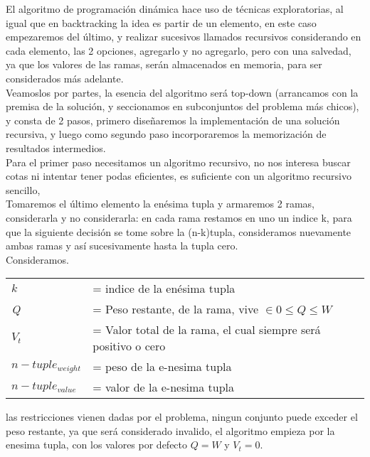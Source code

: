 \documentclass[fleqn, 11pt]{article}
\begin{document}
El algoritmo de programación dinámica hace uso de técnicas exploratorias, al igual que en backtracking la idea es
partir de un elemento, en este caso empezaremos del último, y realizar sucesivos llamados recursivos considerando
en cada elemento, las 2 opciones, agregarlo y no agregarlo, pero con una salvedad, ya que los valores de las ramas,
serán almacenados en memoria, para ser considerados más adelante. \\

Veamoslos por partes, la esencia del algoritmo será top-down (arrancamos con la premisa de la solución, y seccionamos
en subconjuntos del problema más chicos), y consta de 2 pasos, primero diseñaremos la implementación de una solución
recursiva, y luego como segundo paso incorporaremos la memorización de resultados intermedios.  \\

Para el primer paso necesitamos un algoritmo recursivo, no nos interesa buscar cotas ni intentar tener podas eficientes,
es suficiente con un algoritmo recursivo sencillo,  \\

Tomaremos el último elemento la enésima tupla y armaremos 2 ramas, considerarla y no considerarla: en cada rama restamos
en uno un indice k, para que la siguiente decisión se tome sobre la (n-k)tupla, consideramos nuevamente ambas ramas y
así sucesivamente hasta la tupla cero.\\

Consideramos.\\
\begin{tabular}{l l}
    \textit{$k$} & = indice de la enésima tupla  \\
    \textit{Q} & = Peso restante, de la rama, vive $ \in 0 \leq \textit{Q} \leq W $  \\
    \textit{$V_t$} & = Valor total de la rama, el cual siempre será positivo o cero  \\
    \textit{$n-tuple_{weight}$} & = peso de la e-nesima tupla  \\
    \textit{$n-tuple_{value}$} & = valor de la e-nesima tupla  \\

\end{tabular}

las restricciones vienen dadas por el problema, ningun conjunto puede exceder el peso restante, ya que será considerado
invalido, el algoritmo empieza por la enesima tupla, con los valores por defecto $Q = W$ y $V_t = 0$. \\
\end{document}
